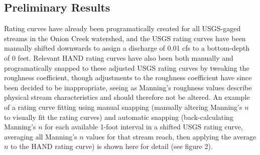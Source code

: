 \documentclass[11pt]{article}
\begin{document}
  \subsection*{Preliminary Results} %

  Rating curves have already been programatically created for all USGS-gaged streams in the Onion Creek watershed, and the USGS rating curves have been manually shifted downwards to assign a discharge of 0.01 cfs to a bottom-depth of 0 feet. Relevant HAND rating curves have also been both manually and programatically snapped to these adjusted USGS rating curves by tweaking the roughness coefficient, though adjustments to the roughness coefficient have since been decided to be inappropriate, seeing as Manning's roughness values describe physical stream characteristics and should therefore not be altered. An example of a rating curve fitting using manual snapping (manually altering Manning's $n$ to visually fit the rating curves) and automatic snapping (back-calculating Manning's $n$ for each available 1-foot interval in a shifted USGS rating curve, averaging all Manning's $n$ values for that stream reach, then applying the average $n$ to the HAND rating curve) is shown here for detail (see figure 2). 
\end{document}
